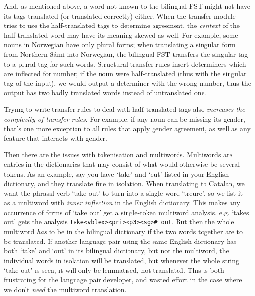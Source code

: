 \documentclass[10pt, a4paper]{article}
\newcommand{\ana}[1]{\texttt{#1}}
\newcommand{\f}[1]{`#1'}
\begin{document}
And, as mentioned above, a word not known to the bilingual FST might
not have its tags translated (or translated correctly) either. When
the transfer module tries to use the half-translated tags to determine
agreement, the \emph{context} of the half-translated word may have its
meaning skewed as well. For example, some nouns in Norwegian have only
plural forms; when translating a singular form from Northern Sámi into
Norwegian, the bilingual FST transfers the singular tag to a plural
tag for such words. Structural transfer rules insert determiners which
are inflected for number; if the noun were half-translated (thus with
the singular tag of the input), we would output a determiner with the
wrong number, thus the output has two badly translated words instead
of untranslated one.

Trying to write transfer rules to deal with half-translated tags also
\emph{increases the complexity of transfer rules}. For example, if any
noun can be missing its gender, that's one more exception to all rules
that apply gender agreement, as well as any feature that interacts
with gender.

Then there are the issues with tokenisation and multiwords. Multiwords
are entries in the dictionaries that may consist of what would
otherwise be several tokens. As an example, say you have \f{take} and
\f{out} listed in your English dictionary, and they translate fine in
isolation. When translating to Catalan, we want the phrasal verb
\f{take out} to turn into a single word \f{treure}, so we list it as a
multiword with \emph{inner inflection} in the English dictionary. This
makes any occurrence of forms of \f{take out} get a single-token
multiword analysis, e.g. \f{takes out} gets the analysis
\ana{take<vblex><pri><p3><sg>\# out}. But then the whole multiword
\emph{has} to be in the bilingual dictionary if the two words together
are to be translated. If another language pair using the same English
dictionary has both \f{take} and \f{out} in its bilingual dictionary,
but not the multiword, the individual words in isolation will be
translated, but whenever the whole string \f{take out} is seen, it
will only be lemmatised, not translated. This is both frustrating for
the language pair developer, and wasted effort in the case where we
don't \emph{need} the multiword translation.
\end{document}
